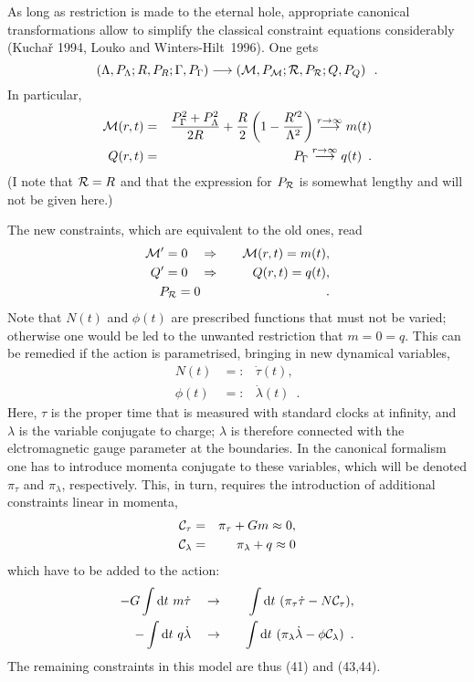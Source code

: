 \documentclass[12pt]{article}
\def\D{{\rm d}}
\newcommand{\bea}{\begin{eqnarray}}
\newcommand{\eea}{\end{eqnarray}}
\begin{document}
As long as restriction is made to the eternal hole,
appropriate canonical transformations allow to simplify the classical
constraint equations considerably (Kucha\v{r} 1994,
Louko and Winters-Hilt~1996). One gets
\[ \left(\Lambda, P_{\Lambda}; R, P_R;
    \Gamma, P_{\Gamma}\right) \longrightarrow
    \left({\cal M}, P_{{\cal M}}; {\cal R}, P_{{\cal R}};
   Q, P_Q\right) \enspace . \]
In particular,
\bea {\cal M}(r,t)&=& \frac{P_{\Gamma}^2+P_{\Lambda}^2}{2R}
   +\frac{R}{2}\left(1-\frac{R'^2}{\Lambda^2}\right)
   \stackrel{r\to\infty}{\longrightarrow} m(t)  \\
    Q(r,t) &=& P_{\Gamma} \stackrel{r\to\infty}
    {\longrightarrow} q(t) \enspace . \eea
(I note that ${\cal R}=R$ and that the expression for
$P_{\cal R}$ is somewhat lengthy and will not be given here.)

The new constraints, which are equivalent to the old ones, read
\bea  {\cal M}'=0 \quad &\Rightarrow& \quad {\cal M}(r,t)=m(t), \\
      Q'=0 \quad &\Rightarrow& \quad Q(r,t)= q(t),  \\
      P_{{\cal R}}=0 & &\enspace . \eea  
Note that $N(t)$ and $\phi(t)$ are prescribed functions that must
not be varied; otherwise one would be led to the unwanted
restriction that $m=0=q$. This can be remedied if the action is
parametrised, bringing in new dynamical variables,
\bea  N(t) &=:& \dot{\tau}(t), \nonumber\\
      \phi(t) &=:& \dot{\lambda}(t) \enspace . \eea
Here, $\tau$ is the proper time that is measured with standard
clocks at infinity, and $\lambda$ is the variable conjugate
to charge; $\lambda$ is therefore connected with the elctromagnetic
gauge parameter at the boundaries.
 In the canonical formalism one has to introduce momenta
conjugate to these variables, which will be denoted
$\pi_{\tau}$ and $\pi_{\lambda}$, respectively.
This, in turn, requires the introduction of additional constraints
linear in momenta,
\bea {\cal C}_{\tau} &=& \pi_{\tau} +Gm\approx 0,  \\
     {\cal C}_{\lambda} &=& \pi_{\lambda} +q \approx 0 \eea
which have to be added to the action:
\bea -G\int\D t\ m\dot{\tau} \quad &\to& \quad
     \int\D t\ (\pi_{\tau}\dot{\tau}-N{\cal C}_{\tau}), \\
    -\int\D t\ q\dot{\lambda} \quad &\to& \quad
     \int\D t\ (\pi_{\lambda}\dot{\lambda}-\phi{\cal C}_{\lambda})
     \enspace . \eea
The remaining constraints in this model are thus (41) and (43,44).
\end{document}
